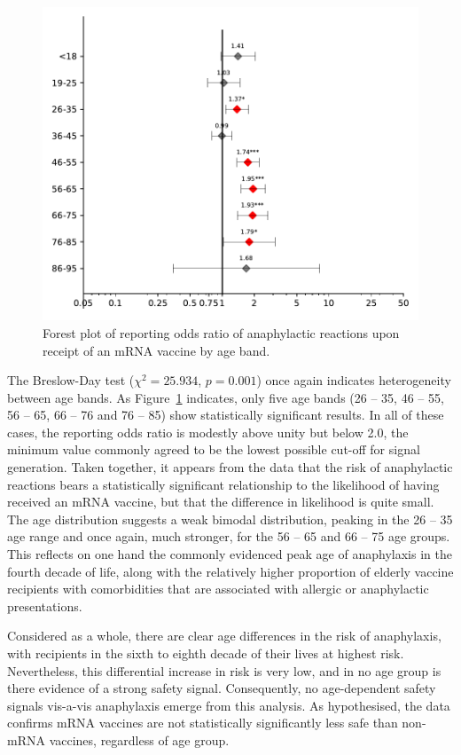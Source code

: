 \documentclass{article}
\begin{document}
\begin{figure}[H]
\centering
\includegraphics[width=12.5 cm]{forest_plot_of_anaphylaxis_by_age}
\caption{Forest plot of reporting odds ratio of anaphylactic reactions upon receipt of an mRNA vaccine by age band.}
\label{fig:age-forest-plot}
\end{figure}

The Breslow-Day test ($\chi^2 = 25.934$, $p = 0.001$) once again indicates heterogeneity between age bands.
As Figure~\ref{fig:age-forest-plot} indicates, only five age bands (26 -- 35, 46 -- 55, 56 -- 65, 66 -- 76 and 76 -- 85) show statistically significant results.
In all of these cases, the reporting odds ratio is modestly above unity but below 2.0, the minimum value commonly agreed to be the lowest possible cut-off for signal generation.
Taken together, it appears from the data that the risk of anaphylactic reactions bears a statistically significant relationship to the likelihood of having received an mRNA vaccine, but that the difference in likelihood is quite small.
The age distribution suggests a weak bimodal distribution, peaking in the 26 -- 35 age range and once again, much stronger, for the 56 -- 65 and 66 -- 75 age groups.
This reflects on one hand the commonly evidenced peak age of anaphylaxis in the fourth decade of life,\cite{lee2017trends} along with the relatively higher proportion of elderly vaccine recipients with comorbidities that are associated with allergic or anaphylactic presentations.

Considered as a whole, there are clear age differences in the risk of anaphylaxis, with recipients in the sixth to eighth decade of their lives at highest risk.
Nevertheless, this differential increase in risk is very low, and in no age group is there evidence of a strong safety signal.
Consequently, no age-dependent safety signals vis-a-vis anaphylaxis emerge from this analysis.
As hypothesised, the data confirms mRNA vaccines are not statistically significantly less safe than non-mRNA vaccines, regardless of age group.
\end{document}
